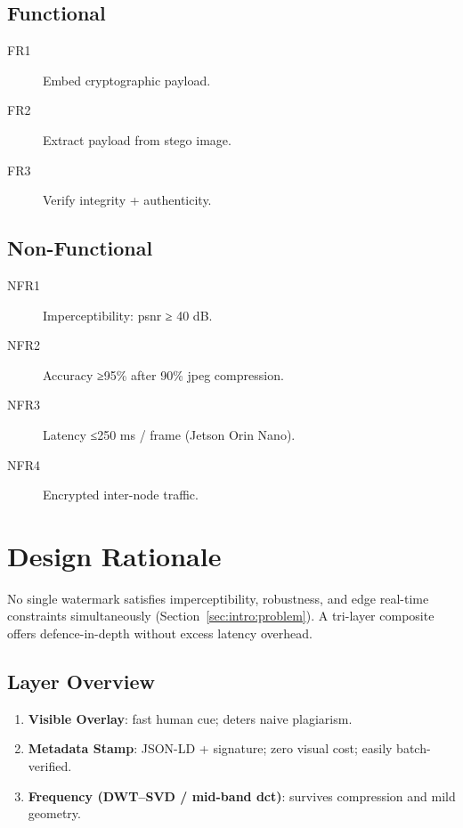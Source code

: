 \subsection{Functional}\label{subsec:functional}
\begin{description}
  \item[FR1] Embed cryptographic payload.
  \item[FR2] Extract payload from stego image.
  \item[FR3] Verify integrity + authenticity.
\end{description}

\subsection{Non-Functional}\label{subsec:non-functional}
\begin{description}
  \item[NFR1] Imperceptibility: \gls{psnr} ≥ 40 dB\@.
  \item[NFR2] Accuracy ≥95\% after 90\% \gls{jpeg} compression.
  \item[NFR3] Latency ≤250 ms / frame (Jetson Orin Nano).
  \item[NFR4] Encrypted inter-node traffic.
\end{description}

\section{Design Rationale}
\label{sec:deep_dive:rationale}
No single watermark satisfies imperceptibility, robustness, and edge real-time constraints simultaneously (Section~\ref{sec:intro:problem}). A tri-layer composite offers defence-in-depth without excess latency overhead.

\subsection{Layer Overview}\label{subsec:layer-overview}
\begin{enumerate}
  \item \textbf{Visible Overlay}: fast human cue; deters naive plagiarism.
  \item \textbf{Metadata Stamp}: JSON-LD + signature; zero visual cost; easily batch-verified.
  \item \textbf{Frequency (DWT–SVD / mid-band \gls{dct})}: survives compression and mild geometry.
\end{enumerate}

